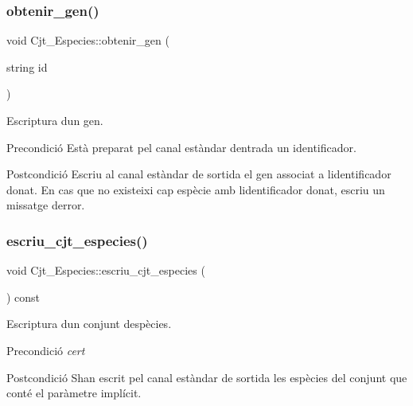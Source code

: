 \subsubsection{\texorpdfstring{obtenir\+\_\+gen()}{obtenir\_gen()}}
{\footnotesize\ttfamily void Cjt\+\_\+\+Especies\+::obtenir\+\_\+gen (\begin{DoxyParamCaption}\item[{string}]{id }\end{DoxyParamCaption})}



Escriptura d\textquotesingle{}un gen. 

\begin{DoxyPrecond}{Precondició}
Està preparat pel canal estàndar d\textquotesingle{}entrada un identificador. 
\end{DoxyPrecond}
\begin{DoxyPostcond}{Postcondició}
Escriu al canal estàndar de sortida el gen associat a l\textquotesingle{}identificador donat. En cas que no existeixi cap espècie amb l\textquotesingle{}identificador donat, escriu un missatge d\textquotesingle{}error. 
\end{DoxyPostcond}
\mbox{\label{class_cjt___especies_ab6945c71800e38fae624c94eae709f2c}} 
\subsubsection{\texorpdfstring{escriu\+\_\+cjt\+\_\+especies()}{escriu\_cjt\_especies()}}
{\footnotesize\ttfamily void Cjt\+\_\+\+Especies\+::escriu\+\_\+cjt\+\_\+especies (\begin{DoxyParamCaption}{ }\end{DoxyParamCaption}) const}



Escriptura d\textquotesingle{}un conjunt d\textquotesingle{}espècies. 

\begin{DoxyPrecond}{Precondició}
{\itshape cert} 
\end{DoxyPrecond}
\begin{DoxyPostcond}{Postcondició}
S\textquotesingle{}han escrit pel canal estàndar de sortida les espècies del conjunt que conté el paràmetre implícit. 
\end{DoxyPostcond}
\mbox{\label{class_cjt___especies_ad7b8b31101e1c5e652bc39cdd3423608}} 
